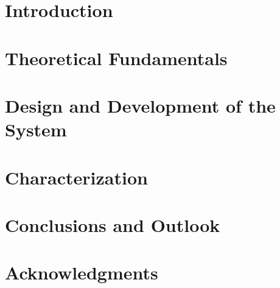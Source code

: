 \documentclass[dvipsnames,table]{include/thesisclass}
\begin{document}
    \FrontMatter
    
	\tikzexternaldisable
    
    \tikzexternalenable
    
    
    
	
    \begingroup   %
    \tableofcontents                    %
    \listoffigures
    \listoftables
    \endgroup
    \cleardoublepage

	

    \MainMatter
    \chapter{Introduction}
    		
    \chapter{Theoretical Fundamentals}
    		
	\chapter{Design and Development of the System}
			
	\chapter{Characterization}	
		
    \chapter{Conclusions and Outlook}
    		
    
	\chapter*{Acknowledgments}
	
	
    \Appendix
    \chapter*{\appendixname} 



	\TheBibliography
	\nocite{*}
	
	


\end{document}
